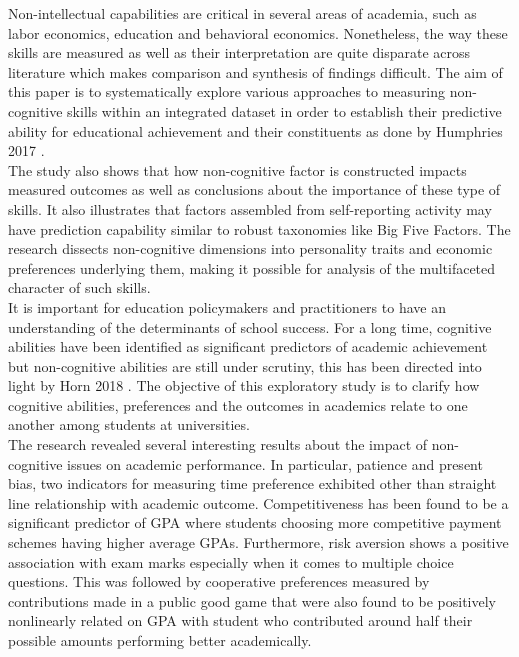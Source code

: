 \documentclass[12pt,a4paper]{article}
\begin{document}
{Non-intellectual capabilities are critical in several areas of academia, such as labor economics, education and behavioral economics. Nonetheless, the way these skills are measured as well as their interpretation are quite disparate across literature which makes comparison and synthesis of findings difficult. The aim of this paper is to systematically explore various approaches to measuring non-cognitive skills within an integrated dataset in order to establish their predictive ability for educational achievement and their constituents as done by Humphries 2017 \cite{humphries2017interpretation}.\\
The study also shows that how non-cognitive factor is constructed impacts measured outcomes as well as conclusions about the importance of these type of skills. It also illustrates that factors assembled from self-reporting activity may have prediction capability similar to robust taxonomies like Big Five Factors. The research dissects non-cognitive dimensions into personality traits and economic preferences underlying them, making it possible for analysis of the multifaceted character of such skills.\\
It is important for education policymakers and practitioners to have an understanding of the determinants of school success. For a long time, cognitive abilities have been identified as significant predictors of academic achievement but non-cognitive abilities are still under scrutiny, this has been directed into light by Horn 2018 \cite{horn2018preferences}. The objective of this exploratory study is to clarify how cognitive abilities, preferences and the outcomes in academics relate to one another among students at universities.\\
The research revealed several interesting results about the impact of non-cognitive issues on academic performance. In particular, patience and present bias, two indicators for measuring time preference exhibited other than straight line relationship with academic outcome. Competitiveness has been found to be a significant predictor of GPA where students choosing more competitive payment schemes having higher average GPAs. Furthermore, risk aversion shows a positive association with exam marks especially when it comes to multiple choice questions. This was followed by cooperative preferences measured by contributions made in a public good game that were also found to be positively nonlinearly related on GPA with student who contributed around half their possible amounts performing better academically.\\
\break

}
\end{document}

